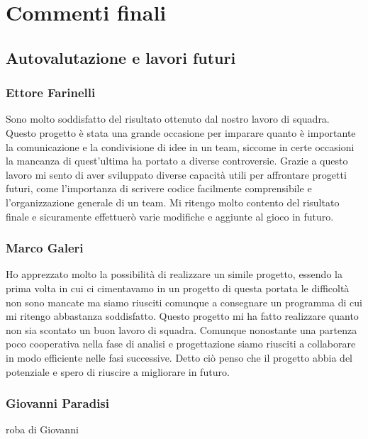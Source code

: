 \documentclass[a4paper,12pt]{report}
\begin{document}
\chapter{Commenti finali}

\section{Autovalutazione e lavori futuri}
\subsection*{Ettore Farinelli}
Sono molto soddisfatto del risultato ottenuto dal nostro lavoro di squadra. Questo progetto è stata una grande occasione per 
imparare quanto è importante la comunicazione e la condivisione di idee in un team, siccome in certe occasioni la mancanza di 
quest'ultima ha portato a diverse controversie. Grazie a questo lavoro mi sento di aver sviluppato diverse capacità utili per 
affrontare progetti futuri, come l'importanza di scrivere codice facilmente comprensibile e l'organizzazione generale di un team.
Mi ritengo molto contento del risultato finale e sicuramente effettuerò varie modifiche e aggiunte al gioco in futuro.
\subsection*{Marco Galeri}
Ho apprezzato molto la possibilità di realizzare un simile progetto, essendo la prima volta in cui ci cimentavamo in un progetto di questa portata le difficoltà non sono mancate ma siamo riusciti comunque a consegnare un programma di cui mi ritengo abbastanza soddisfatto.
 Questo progetto mi ha fatto realizzare quanto non sia scontato un buon lavoro di squadra.
 Comunque nonostante una partenza poco cooperativa nella fase di analisi e progettazione siamo riusciti a collaborare in modo efficiente nelle fasi successive.
 Detto ciò penso che il progetto abbia del potenziale e spero di riuscire a migliorare in futuro.
\subsection*{Giovanni Paradisi}
roba di Giovanni
\end{document}
